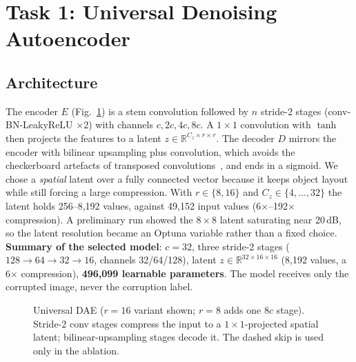 ﻿\documentclass[conference]{IEEEtran}
\begin{document}
\section{Task 1: Universal Denoising Autoencoder}\label{sec:t1}
\subsection{Architecture}
The encoder $E$ (Fig.~\ref{fig:dae}) is a stem convolution followed by $n$ stride-2 stages
(conv-BN-LeakyReLU $\times2$) with channels $c,2c,4c,8c$. A $1\times1$ convolution with $\tanh$ then
projects the features to a latent $z\in\mathbb{R}^{C_z\times r\times r}$. The decoder $D$ mirrors the
encoder with bilinear upsampling plus convolution, which avoids the checkerboard artefacts of transposed
convolutions~\cite{odena2016checkerboard}, and ends in a sigmoid. We chose a \emph{spatial} latent over
a fully connected vector because it keeps object layout while still forcing a large compression. With
$r\in\{8,16\}$ and $C_z\in\{4,\dots,32\}$ the latent holds 256--8,192 values, against 49,152 input
values (6$\times$--192$\times$ compression). A preliminary run showed the $8\times8$ latent saturating
near 20\,dB, so the latent resolution became an Optuna variable rather than a fixed choice.
\textbf{Summary of the selected model}: $c=32$, three stride-2 stages ($128\to64\to32\to16$, channels
32/64/128), latent $z\in\mathbb{R}^{32\times16\times16}$ (8,192 values, a 6$\times$ compression),
\textbf{496,099 learnable parameters}. The model receives only the corrupted image, never the
corruption label.

\begin{figure}[t]
\centering
{}
\caption{Universal DAE ($r=16$ variant shown; $r=8$ adds one $8c$ stage). Stride-2 conv stages
compress the input to a $1{\times}1$-projected spatial latent; bilinear-upsampling stages decode it. The dashed
skip is used only in the ablation.}
\label{fig:dae}
\end{figure}
\end{document}
